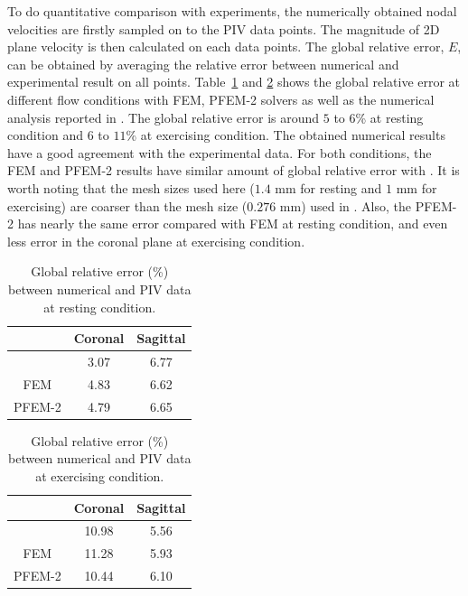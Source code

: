 To do quantitative comparison with experiments, the numerically obtained nodal velocities are firstly sampled on to the PIV data points. The magnitude of 2D plane velocity is then calculated on each data points. The global relative error, $E$, can be obtained by averaging the relative error between numerical and experimental result on all points. Table~\ref{tab:rest} and \ref{tab:exercise} shows the global relative error at different flow conditions with FEM, PFEM-2 solvers as well as the numerical analysis reported in \cite{craven_cfd}. The global relative error is around $5$ to $6$\% at resting condition and $6$ to $11$\% at exercising condition. The obtained numerical results have a good agreement with the experimental data. For both conditions, the FEM and PFEM-2 results have similar amount of global relative error with \cite{craven_cfd}. It is worth noting that the mesh sizes used here ($1.4$ mm for resting and $1$ mm for exercising) are coarser than the mesh size ($0.276$ mm) used in \cite{craven_cfd}. Also, the PFEM-2 has nearly the same error compared with FEM at resting condition, and even less error in the coronal plane at exercising condition.

\begin{table}[h!]
\caption {Global relative error (\%) between numerical and PIV data at resting condition.} \label{tab:rest}
\centering
\begin{tabular}{|c|c|c|}
\hline
       & Coronal & Sagittal \\ \hline
\cite{craven_cfd}  & 3.07    & 6.77     \\ \hline
FEM    & 4.83    & 6.62     \\ \hline
PFEM-2 & 4.79    & 6.65     \\ \hline
\end{tabular}
\end{table}

\begin{table}[h!]
\caption {Global relative error (\%) between numerical and PIV data at exercising condition.} \label{tab:exercise}
\centering
\begin{tabular}{|c|c|c|}
\hline
       & Coronal & Sagittal \\ \hline
\cite{craven_cfd}  & 10.98	&5.56 \\ \hline
FEM    &  11.28    &  5.93  \\ \hline
PFEM-2 &  10.44   &  6.10     \\ \hline
\end{tabular}
\end{table}
